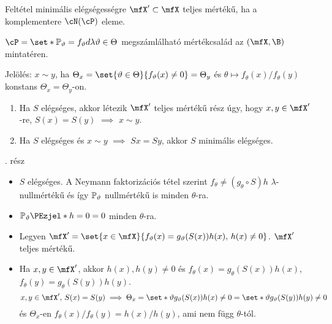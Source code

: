\documentclass[aspectratio=169,notheorems,9pt,\option]{beamer}
\begin{document}
\begin{frame}{Feltétel minimális elégségességre}
  $\mfX'\subset\mfX$ teljes mértékű, ha a komplementere $\cN(\cP)$ eleme.
  \begin{theorem} $\cP=\set*{\P[\theta]=f_\theta d\lambda}{\theta\in\Theta}$ megszámlálható
     mértékcsalád az $(\mfX,\B)$ mintatéren.

     Jelölés: $x\sim y$, ha $\Theta_x=\set{\theta\in\Theta}{f_\theta(x)\neq0}=\Theta_y$ és 
     $\theta\mapsto f_\theta(x)/f_{\theta}(y)$ konstans $\Theta_x=\Theta_y$-on.
    \begin{enumerate}[<*>]
      \item Ha $S$ elégséges, akkor létezik $\mfX'$ teljes mértékű rész úgy, 
      hogy $x,y\in\mfX'$-re, $S(x)=S(y)$ $\implies$  $x\sim y$.
      \item Ha $S$ elégséges és  $x\sim y$ $\implies$ $Sx=Sy$, akkor $S$ minimális elégséges. 
    \end{enumerate}
  \end{theorem}
  . rész
  \begin{itemize}
    \item $S$ elégséges. A Neymann faktorizációs tétel szerint
    $f_\theta\neq (g_\theta\circ S)h$ $\lambda$-nullmértékű
    és így $\P[\theta]$ nullmértékű is minden $\theta$-ra. 

    \item $\P[\theta]{h=0}=0$  minden $\theta$-ra.
    
    \item Legyen $\mfX'=\set{x\in\mfX}{f_\theta(x)=g_\theta(S(x))h(x),\,h(x)\neq0}$. 
    $\mfX'$ teljes mértékű.
    
    \item Ha $x,y\in\mfX'$, akkor $h(x),h(y)\neq0$ és 
    $f_{\theta}(x)=g_\theta(S(x))h(x)$, $f_{\theta}(y)=g_\theta(S(y))h(y)$.
    \begin{displaymath}
      x,y\in\mfX',\,S(x)=S(y)\implies 
      \Theta_{x}=\set*{\theta}{%
        g_\theta(S(x))h(x)\neq0}
      =\set*{\theta}{%
        g_\theta(S(y))h(y)\neq0}
    \end{displaymath} 
    és $\Theta_x$-en
    $f_\theta(x)/f_\theta(y)=h(x)/h(y)$, ami nem függ $\theta$-tól.
  \end{itemize}
\end{frame}
\end{document}
